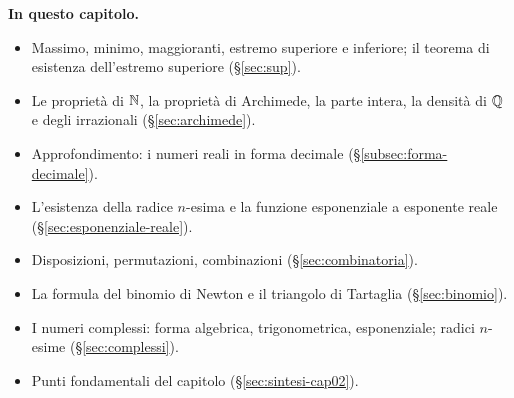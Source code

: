 \medskip
\noindent\textbf{In questo capitolo.}
\begin{itemize}
  \item Massimo, minimo, maggioranti, estremo superiore e inferiore; il teorema di
  esistenza dell'estremo superiore (\S\ref{sec:sup}).
  \item Le proprietà di $\mathbb{N}$, la proprietà di Archimede, la parte intera, la densità di
  $\mathbb{Q}$ e degli irrazionali (\S\ref{sec:archimede}).
  \item Approfondimento: i numeri reali in forma decimale (\S\ref{subsec:forma-decimale}).
  \item L'esistenza della radice $n$-esima e la funzione esponenziale a esponente reale
  (\S\ref{sec:esponenziale-reale}).
  \item Disposizioni, permutazioni, combinazioni (\S\ref{sec:combinatoria}).
  \item La formula del binomio di Newton e il triangolo di Tartaglia (\S\ref{sec:binomio}).
  \item I numeri complessi: forma algebrica, trigonometrica, esponenziale; radici
  $n$-esime (\S\ref{sec:complessi}).
  \item Punti fondamentali del capitolo (\S\ref{sec:sintesi-cap02}).
\end{itemize}









